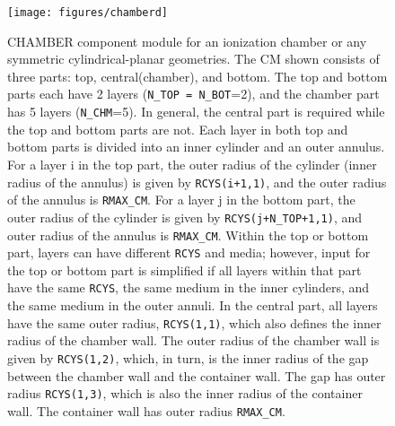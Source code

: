 \documentclass[12pt,twoside]{article}
\begin{document}
\begin{figure}[h]
\begin{center}
\leavevmode
\mbox{}\hspace{0cm}
\texttt{[image: figures/chamberd]}
\end{center}
\caption[CHAMBER CM geometry]
{CHAMBER component module for an ionization chamber or any symmetric
cylindrical-planar geometries. The CM shown consists of three parts: top,
central(chamber), and bottom.  The top and bottom parts each have 2
layers ({\tt N\_TOP = N\_BOT}=2),
and the chamber part has 5 layers ({\tt N\_CHM}=5).  In
general, the central part is required while the
top and bottom parts are not.  Each layer in both top and bottom parts
is divided into an inner cylinder and an outer annulus.  For a
layer i in the top part, the outer
radius of the cylinder (inner radius of the annulus) is given by
{\tt RCYS(i+1,1)}, and the outer radius of the annulus is {\tt RMAX\_CM}.
For a
layer j in the bottom part, the outer radius of the cylinder is
given by {\tt RCYS(j+N\_TOP+1,1)}, and outer radius of the annulus is
{\tt RMAX\_CM}.
Within the top or bottom part, layers can have different {\tt RCYS} and media;
however, input for the top or bottom part is simplified if all layers
within that
part have the same {\tt RCYS}, the same medium in the inner cylinders, and
the same medium in the outer annuli.  In the central part, all layers
have the same outer radius, {\tt RCYS(1,1)}, which also defines the inner
radius of the chamber wall.  The outer radius of the chamber wall is
given by {\tt RCYS(1,2)}, which, in turn, is the inner radius of the gap
between the chamber wall and the container wall.  The gap has outer
radius {\tt RCYS(1,3)}, which is also the inner radius of the container wall.
The container wall has outer radius {\tt RMAX\_CM}.}
\label{fig_CHAMBERD}
\end{figure}
\clearpage
\end{document}
